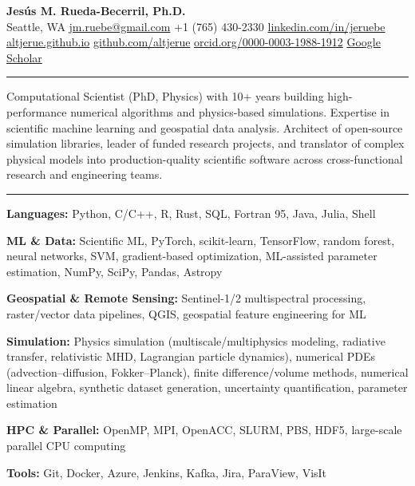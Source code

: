 \documentclass[10pt,letterpaper]{article}
\newcommand{\cvsection}[1]{%
  \vspace{5pt}{\large\bfseries #1}\par\nopagebreak\vspace{2pt}\hrule
  \nopagebreak\vspace{3pt}\nopagebreak}
\begin{document}
\begin{center}
  {\LARGE\bfseries Jesús M. Rueda-Becerril, Ph.D.}\\[3pt]
  Seattle, WA \textbar{} \href{mailto:jm.ruebe@gmail.com}{jm.ruebe@gmail.com} \textbar{} +1 (765) 430-2330 \textbar{} \href{https://linkedin.com/in/jeruebe}{linkedin.com/in/jeruebe}\\
  \href{https://altjerue.github.io}{altjerue.github.io} \textbar{} \href{https://github.com/altjerue}{github.com/altjerue} \textbar{} \href{https://orcid.org/0000-0003-1988-1912}{orcid.org/0000-0003-1988-1912} \textbar{} \href{https://scholar.google.com/citations?user=hrld5zgAAAAJ}{Google Scholar}
\end{center}

\cvsection{Professional Summary}
Computational Scientist (PhD, Physics) with 10+ years building high-performance numerical algorithms and physics-based simulations. Expertise in scientific machine learning and geospatial data analysis. Architect of open-source simulation libraries, leader of funded research projects, and translator of complex physical models into production-quality scientific software across cross-functional research and engineering teams.\par

\cvsection{Skills}
\textbf{Languages:} Python, C/C++, R, Rust, SQL, Fortran 95, Java, Julia, Shell\par
\textbf{ML \& Data:} Scientific ML, PyTorch, scikit-learn, TensorFlow, random forest, neural networks, SVM, gradient-based optimization, ML-assisted parameter estimation, NumPy, SciPy, Pandas, Astropy\par
\textbf{Geospatial \& Remote Sensing:} Sentinel-1/2 multispectral processing, raster/vector data pipelines, QGIS, geospatial feature engineering for ML\par
\textbf{Simulation:} Physics simulation (multiscale/multiphysics modeling, radiative transfer, relativistic MHD, Lagrangian particle dynamics), numerical PDEs (advection–diffusion, Fokker–Planck), finite difference/volume methods, numerical linear algebra, synthetic dataset generation, uncertainty quantification, parameter estimation\par
\textbf{HPC \& Parallel:} OpenMP, MPI, OpenACC, SLURM, PBS, HDF5, large-scale parallel CPU computing\par
\textbf{Tools:} Git, Docker, Azure, Jenkins, Kafka, Jira, ParaView, VisIt\par
\end{document}
